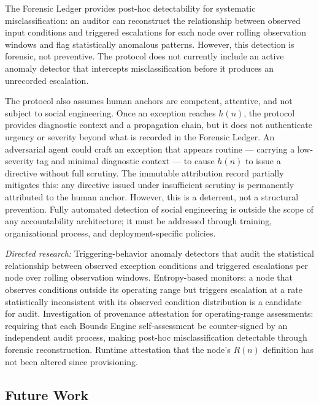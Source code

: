 The Forensic Ledger provides post-hoc detectability for systematic misclassification: an auditor can reconstruct the relationship between observed input conditions and triggered escalations for each node over rolling observation windows and flag statistically anomalous patterns. However, this detection is forensic, not preventive. The protocol does not currently include an active anomaly detector that intercepts misclassification before it produces an unrecorded escalation.

The protocol also assumes human anchors are competent, attentive, and not subject to social engineering. Once an exception reaches $h(n)$, the protocol provides diagnostic context and a propagation chain, but it does not authenticate urgency or severity beyond what is recorded in the Forensic Ledger. An adversarial agent could craft an exception that appears routine — carrying a low-severity tag and minimal diagnostic context — to cause $h(n)$ to issue a directive without full scrutiny. The immutable attribution record partially mitigates this: any directive issued under insufficient scrutiny is permanently attributed to the human anchor. However, this is a deterrent, not a structural prevention. Fully automated detection of social engineering is outside the scope of any accountability architecture; it must be addressed through training, organizational process, and deployment-specific policies.

\textit{Directed research:} Triggering-behavior anomaly detectors that audit the statistical relationship between observed exception conditions and triggered escalations per node over rolling observation windows. Entropy-based monitors: a node that observes conditions outside its operating range but triggers escalation at a rate statistically inconsistent with its observed condition distribution is a candidate for audit. Investigation of provenance attestation for operating-range assessments: requiring that each Bounds Engine self-assessment be counter-signed by an independent audit process, making post-hoc misclassification detectable through forensic reconstruction. Runtime attestation that the node's $R(n)$ definition has not been altered since provisioning.

\subsection{Future Work}

